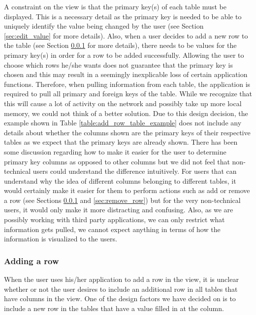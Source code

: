 \documentclass[12pt]{article}
\begin{document}
A constraint on the view is that the primary key(s) of each table must be displayed.  This is a necessary detail as the primary key is needed to be able to uniquely identify the value being changed by the user (see Section \ref{sec:edit_value} for more details). Also, when a user decides to add a new row to the table (see Section \ref{sec:add_row} for more details), there needs to be values for the primary key(s) in order for a row to be added successfully. Allowing the user to choose which rows he/she wants does not guarantee that the primary key is chosen and this may result in a seemingly inexplicable loss of certain application functions. Therefore, when pulling information from each table, the application is required to pull all primary and foreign keys of the table. While we recognize that this will cause a lot of activity on the network and possibly take up more local memory, we could not think of a better solution. Due to this design decision, the example shown in Table \ref{table:add_row_table_example} does not include any details about whether the columns shown are the primary keys of their respective tables as we expect that the primary keys are already shown. There has been some discussion regarding how to make it easier for the user to determine primary key columns as opposed to other columns but we did not feel that non-technical users could understand the difference intuitively. For users that can understand why the idea of different columns belonging to different tables, it would certainly make it easier for them to perform actions such as add or remove a row (see Sections \ref{sec:add_row} and \ref{sec:remove_row}) but for the very non-technical users, it would only make it more distracting and confusing. Also, as we are possibly working with third party applications, we can only restrict what information gets pulled, we cannot expect anything in terms of how the information is visualized to the users.

\subsubsection{Adding a row}
\label{sec:add_row}
When the user uses his/her application to add a row in the view, it is unclear whether or not the user desires to include an additional row in all tables that have columns in the view. One of the design factors we have decided on is to include a new row in the tables that have a value filled in at the column. 
\end{document}
